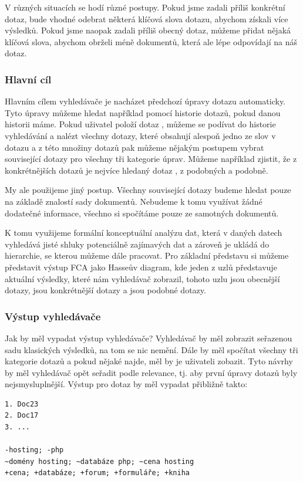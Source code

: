 \documentclass[12pt]{article}
\newcommand{\sssection}[1]{\subsubsection{#1}}
\begin{document}
V různých situacích se hodí různé postupy. Pokud jsme zadali příliš konkrétní dotaz, bude vhodné odebrat některá klíčová slova dotazu, abychom získali více výsledků. Pokud jsme naopak zadali příliš obecný dotaz, můžeme přidat nějaká klíčová slova, abychom obrželi méně dokumentů, která ale lépe odpovídají na náš dotaz. 

\sssection{Hlavní cíl}

Hlavním cílem vyhledávače je nacházet předchozí úpravy dotazu automaticky. Tyto úpravy můžeme hledat například pomocí historie dotazů, pokud danou historii máme. Pokud uživatel položí dotaz , můžeme se podívat do historie vyhledávání a nalézt všechny dotazy, které obsahují alespoň jedno ze slov v dotazu a z této množiny dotazů pak můžeme nějakým postupem vybrat související dotazy pro všechny tři kategorie úprav. Můžeme například zjistit, že z konkrétnějších dotazů je nejvíce hledaný dotaz , z podobných  a podobně. 

My ale použijeme jiný postup. Všechny související dotazy budeme hledat pouze na základě znalostí sady dokumentů. Nebudeme k tomu využívat žádné dodatečné informace, všechno si spočítáme pouze ze samotných dokumentů.

K tomu využijeme formální konceptuální analýzu dat, která v daných datech vyhledává jisté shluky potenciálně zajímavých dat a zároveň je ukládá do hierarchie, se kterou můžeme dále pracovat. Pro základní představu si můžeme představit výstup FCA jako Hasseův diagram, kde jeden z uzlů představuje aktuální výsledky, které nám vyhledávač zobrazil,  tohoto uzlu jsou obecnější dotazy,  jsou konkrétnější dotazy a  jsou podobné dotazy. 

\sssection{Výstup vyhledávače}

Jak by měl vypadat výstup vyhledávače? Vyhledávač by měl zobrazit seřazenou sadu klasických výsledků, na tom se nic nemění. Dále by měl spočítat všechny tři kategorie dotazů a pokud nějaké najde, měl by je uživateli zobazit. Tyto návrhy by měl vyhledávač opět seřadit podle relevance, tj. aby první úpravy dotazů byly nejsmysluplnější. Výstup pro dotaz  by měl vypadat přibližně takto:

\begin{verbatim}
1. Doc23
2. Doc17
3. ... 

-hosting; -php
~domény hosting; ~databáze php; ~cena hosting
+cena; +databáze; +forum; +formuláře; +kniha
\end{verbatim}
\end{document}
